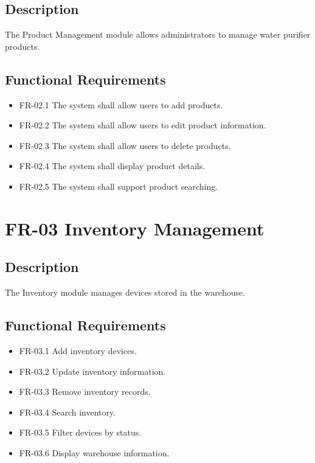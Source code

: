 \subsection*{Description}

The Product Management module allows administrators to manage water purifier products.

\subsection*{Functional Requirements}

\begin{itemize}
    \item FR-02.1 The system shall allow users to add products.
    \item FR-02.2 The system shall allow users to edit product information.
    \item FR-02.3 The system shall allow users to delete products.
    \item FR-02.4 The system shall display product details.
    \item FR-02.5 The system shall support product searching.
\end{itemize}

\section{FR-03 Inventory Management}

\subsection*{Description}

The Inventory module manages devices stored in the warehouse.

\subsection*{Functional Requirements}

\begin{itemize}
    \item FR-03.1 Add inventory devices.
    \item FR-03.2 Update inventory information.
    \item FR-03.3 Remove inventory records.
    \item FR-03.4 Search inventory.
    \item FR-03.5 Filter devices by status.
    \item FR-03.6 Display warehouse information.
\end{itemize}


